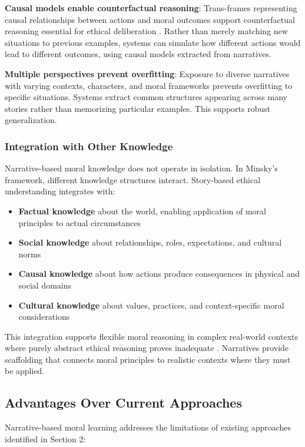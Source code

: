 \documentclass[12pt]{article}
\begin{document}
\textbf{Causal models enable counterfactual reasoning}: Trans-frames representing causal relationships between actions and moral outcomes support counterfactual reasoning essential for ethical deliberation \citep{pearl2009causality}. Rather than merely matching new situations to previous examples, systems can simulate how different actions would lead to different outcomes, using causal models extracted from narratives.

\textbf{Multiple perspectives prevent overfitting}: Exposure to diverse narratives with varying contexts, characters, and moral frameworks prevents overfitting to specific situations. Systems extract common structures appearing across many stories rather than memorizing particular examples. This supports robust generalization.

\subsubsection{Integration with Other Knowledge}

Narrative-based moral knowledge does not operate in isolation. In Minsky's framework, different knowledge structures interact. Story-based ethical understanding integrates with:

\begin{itemize}
\item \textbf{Factual knowledge} about the world, enabling application of moral principles to actual circumstances
\item \textbf{Social knowledge} about relationships, roles, expectations, and cultural norms
\item \textbf{Causal knowledge} about how actions produce consequences in physical and social domains
\item \textbf{Cultural knowledge} about values, practices, and context-specific moral considerations
\end{itemize}

This integration supports flexible moral reasoning in complex real-world contexts where purely abstract ethical reasoning proves inadequate \citep{nussbaum1990love}. Narratives provide scaffolding that connects moral principles to realistic contexts where they must be applied.

\subsection{Advantages Over Current Approaches}

Narrative-based moral learning addresses the limitations of existing approaches identified in Section 2:
\end{document}
